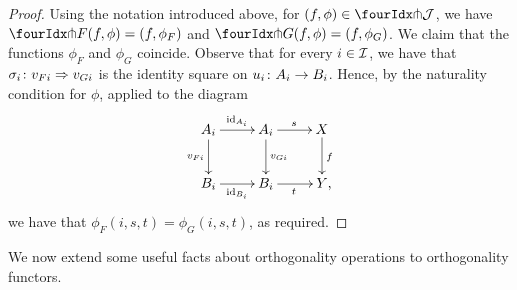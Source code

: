 \documentclass[reqno,10pt,a4paper,oneside,draft]{amsart}
\begin{document}
\begin{proof} Using the notation introduced above, for $(f, \phi) \in \liftr{\cal{J}}$, we have $\liftr{F}(f, \phi) = (f, \phi_F)$ and $\liftr{G}(f, \phi) = (f, \phi_G)$.
We claim that the functions $\phi_F$ and $\phi_G$ coincide.
Observe that for every $i \in \cal{I}$, we have that $\sigma_i \co v_{Fi} \Rightarrow v_{Gi}$ is the identity square on $u_i \co A_i \to B_i$.
Hence, by the naturality condition for $\phi$, applied to the diagram
\[
\xymatrix{
  A_i \ar[r]^{\id_{A_i}} \ar[d]_{v_{Fi}} & A_i \ar[d]^{v_{Gi}} \ar[r]^{s} & X \ar[d]^{f} \\
  B_i \ar[r]_{\id_{B_i}} & B_i \ar[r]_{t} & Y
\rlap{,}}
\]
we have that $\phi_F(i, s, t) = \phi_G(i, s, t)$, as required.
\end{proof}

We now extend some useful facts about orthogonality operations to orthogonality functors.
\end{document}
